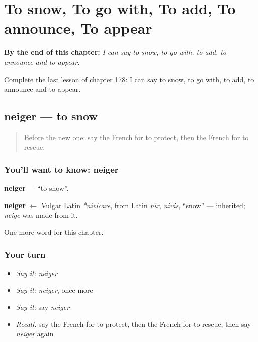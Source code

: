 
\chapter{To snow, To go with, To add, To announce, To appear}
\label{ch:fr-to-snow-to-go-with-to-add-to-announce-to-appear}

\begin{chapteropening}
\textbf{By the end of this chapter:} \emph{I can say to snow, to go with, to add, to announce and to appear.}

Complete the last lesson of chapter 178: I can say to snow, to go with, to add, to announce and to appear.
\end{chapteropening}

\section[neiger]{neiger — to snow}

\label{lesson:FR-C178-neiger}



\begin{quote}
Before the new one: say the French for to protect, then the French for to rescue.
\end{quote}

\subsection*{You'll want to know: neiger}
\textbf{neiger} — \textquotedblleft{}to snow\textquotedblright{}.

\begin{cousinweb}
\textbf{neiger} $\leftarrow$ Vulgar Latin \emph{*nivicare}, from Latin \emph{nix}, \emph{nivis}, \textquotedblleft{}snow\textquotedblright{} — inherited; \emph{neige} was made from it.
\end{cousinweb}

\begin{grammarlens}[title={What you've built}]
One more word for this chapter.
\end{grammarlens}

\subsection*{Your turn}
\begin{itemize}
\raggedright
  \item \emph{Say it:} \emph{neiger}
  \item \emph{Say it:} \emph{neiger}, once more
  \item \emph{Say it:} say \emph{neiger}
  \item \emph{Recall:} say the French for to protect, then the French for to rescue, then say \emph{neiger} again
\end{itemize}

